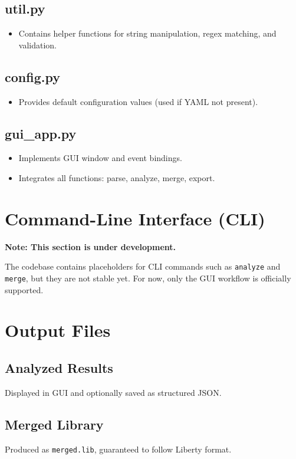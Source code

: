 \documentclass[12pt,a4paper]{article}
\begin{document}
\subsection{util.py}
\begin{itemize}
    \item Contains helper functions for string manipulation, regex matching, and validation.
\end{itemize}

\subsection{config.py}
\begin{itemize}
    \item Provides default configuration values (used if YAML not present).
\end{itemize}

\subsection{gui\_app.py}
\begin{itemize}
    \item Implements GUI window and event bindings.
    \item Integrates all functions: parse, analyze, merge, export.
\end{itemize}

\section{Command-Line Interface (CLI)}
\textbf{Note: This section is under development.}  

The codebase contains placeholders for CLI commands such as \texttt{analyze} and \texttt{merge}, but they are not stable yet. For now, only the GUI workflow is officially supported.

\section{Output Files}
\subsection{Analyzed Results}
Displayed in GUI and optionally saved as structured JSON.

\subsection{Merged Library}
Produced as \texttt{merged.lib}, guaranteed to follow Liberty format.
\end{document}
